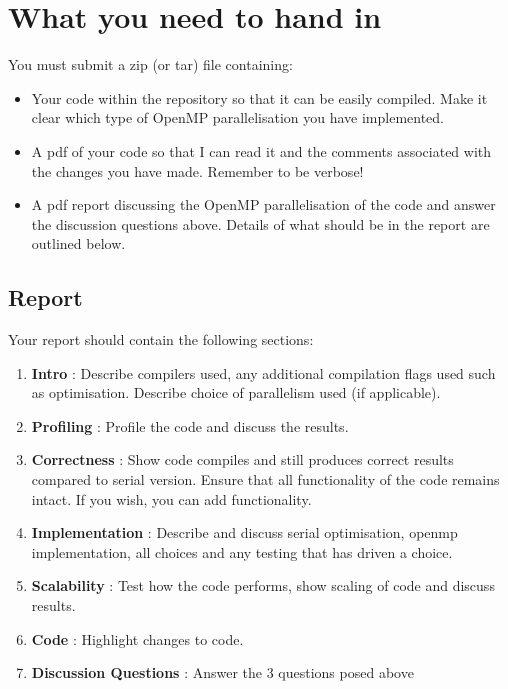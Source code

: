 \documentclass[11pt]{amsart}
\begin{document}
\section{{\color{Blue}What you need to hand in\nopunct\\}}\label{sec:handin}

You must submit a zip (or tar) file containing:
\begin{itemize}
  \item Your code within the repository so that it can be easily compiled. Make it clear which type of OpenMP parallelisation you have implemented.
  \item A pdf of your code so that I can read it and the comments associated with the changes you have made. Remember to be verbose!
  \item A pdf report discussing the OpenMP parallelisation of the code and answer the discussion questions above. Details of what should be in the report are outlined below.
\end{itemize}

\subsection*{Report\nopunct\\}\label{sec:handin:report}
\noindent Your report should contain the following sections:
  \begin{enumerate}
  \item{\textbf{Intro} : Describe compilers used, any additional compilation flags used such as optimisation. Describe choice of parallelism used (if applicable).} 
  \item{\textbf{Profiling} : Profile the code and discuss the results.}
  \item{\textbf{Correctness} : Show code compiles and still produces correct results compared to serial version. Ensure that all functionality of the code remains intact. If you wish, you can add functionality.}
  \item{\textbf{Implementation} : Describe and discuss serial optimisation, openmp implementation, all choices and any testing that has driven a choice.}
  \item{\textbf{Scalability} : Test how the code performs, show scaling of code and discuss results.}
  \item{\textbf{Code} : Highlight changes to code.}
  \item{\textbf{Discussion Questions} : Answer the 3 questions posed above}
\end{enumerate}
\end{document}
